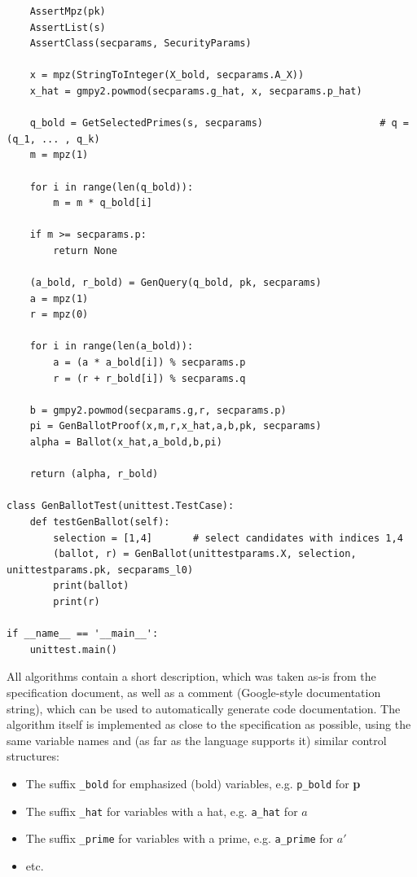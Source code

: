 \begin{verbatim}
    AssertMpz(pk)
    AssertList(s)
    AssertClass(secparams, SecurityParams)

    x = mpz(StringToInteger(X_bold, secparams.A_X))
    x_hat = gmpy2.powmod(secparams.g_hat, x, secparams.p_hat)

    q_bold = GetSelectedPrimes(s, secparams)                    # q = (q_1, ... , q_k)
    m = mpz(1)

    for i in range(len(q_bold)):
        m = m * q_bold[i]

    if m >= secparams.p:
        return None

    (a_bold, r_bold) = GenQuery(q_bold, pk, secparams)
    a = mpz(1)
    r = mpz(0)

    for i in range(len(a_bold)):
        a = (a * a_bold[i]) % secparams.p
        r = (r + r_bold[i]) % secparams.q

    b = gmpy2.powmod(secparams.g,r, secparams.p)
    pi = GenBallotProof(x,m,r,x_hat,a,b,pk, secparams)
    alpha = Ballot(x_hat,a_bold,b,pi)

    return (alpha, r_bold)

class GenBallotTest(unittest.TestCase):
    def testGenBallot(self):
        selection = [1,4]       # select candidates with indices 1,4
        (ballot, r) = GenBallot(unittestparams.X, selection, unittestparams.pk, secparams_l0)
        print(ballot)
        print(r)

if __name__ == '__main__':
    unittest.main()
\end{verbatim}

All algorithms contain a short description, which was taken as-is from the specification document, as well as a comment (Google-style documentation string), which can be used to automatically generate code documentation. The algorithm itself is implemented as close to the specification as possible, using the same variable names and (as far as the language supports it) similar control structures:

\begin{itemize}
	\item The suffix \texttt{\_bold} for emphasized (bold) variables, e.g. \texttt{p\_bold} for \textbf{p}
	\item The suffix \texttt{\_hat} for variables with a hat, e.g. \texttt{a\_hat} for $\hat{a}$
	\item The suffix \texttt{\_prime} for variables with a prime, e.g. \texttt{a\_prime} for $a'$
	\item etc.
\end{itemize}

